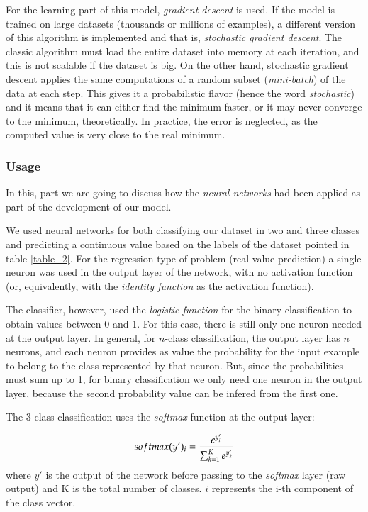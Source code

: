 For the learning part of this model, {\it gradient descent} is used. If the 
model is trained on large datasets (thousands or millions of examples), a 
different version of this algorithm is implemented and that is, {\it stochastic 
gradient descent}. The classic algorithm must load the entire dataset into memory 
at each iteration, and this is not scalable if the dataset is big. On the other 
hand, stochastic gradient descent applies the same computations of a random 
subset ({\it mini-batch}) of the data at each step. This gives it a probabilistic 
flavor (hence the word {\it stochastic}) and it means that it can either find the minimum 
faster, or it may never converge to the minimum, theoretically. In practice, the error 
is neglected, as the computed value is very close to the real minimum.

\subsubsection{Usage}

In this, part we are going to discuss how the {\it neural networks} had been  
applied as part of the development of our model. 

We used neural networks for both classifying our dataset in two and three classes 
and predicting a continuous value based on the labels of the dataset pointed in table 
\ref{table_2}. For the regression type of problem (real value prediction) a single 
neuron was used in the output layer of the network, with no activation function 
(or, equivalently, with the {\it identity function} as the activation function). 

The classifier, however, used the {\it logistic function} for the binary classification 
to obtain values between 0 and 1. For this case, there is still only one neuron 
needed at the output layer. In general, for $n$-class classification, the output layer 
has $n$ neurons, and each neuron provides as value the probability for the input 
example to belong to the class represented by that neuron. But, since the 
probabilities must sum up to 1, for binary classification we only need one 
neuron in the output layer, because the second probability value can be infered 
from the first one.

The 3-class classification uses the {\it softmax} function at the output layer:

\begin{equation}
\centering
softmax(y')_{i} = \frac{e^{y'_{i}}}{\sum_{k=1}^K e^{y'_{k}}}
\end{equation}
where $y'$ is the output of the network before passing to the {\it softmax} 
layer (raw output) and K is the total number of classes. $i$ represents 
the i-th component of the class vector.

